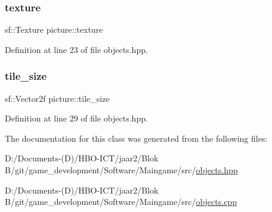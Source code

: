 \mbox{\label{classpicture_a030e9c03d143b019986e9a5346746c11}} 
\subsubsection{\texorpdfstring{texture}{texture}}
{\footnotesize\ttfamily sf\+::\+Texture picture\+::texture\hspace{0.3cm}{\ttfamily [private]}}



Definition at line 23 of file objects.\+hpp.

\mbox{\label{classpicture_adff8f66e606a6c2e9a8f8b76d4ced587}} 
\subsubsection{\texorpdfstring{tile\+\_\+size}{tile\_size}}
{\footnotesize\ttfamily sf\+::\+Vector2f picture\+::tile\+\_\+size}



Definition at line 29 of file objects.\+hpp.



The documentation for this class was generated from the following files\+:\begin{DoxyCompactItemize}
\item 
D\+:/\+Documents-\/(\+D)/\+H\+B\+O-\/\+I\+C\+T/jaar2/\+Blok B/git/game\+\_\+development/\+Software/\+Maingame/src/\hyperlink{objects_8hpp}{objects.\+hpp}\item 
D\+:/\+Documents-\/(\+D)/\+H\+B\+O-\/\+I\+C\+T/jaar2/\+Blok B/git/game\+\_\+development/\+Software/\+Maingame/src/\hyperlink{objects_8cpp}{objects.\+cpp}\end{DoxyCompactItemize}
